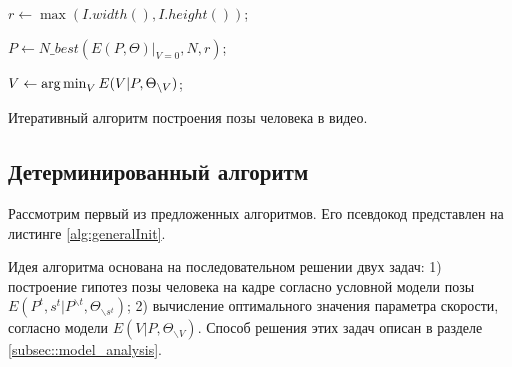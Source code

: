 \begin{algorithm}[t]
	\SetAlgoLined %
	
	
	
	$r \leftarrow \max(I.width(), I.height())$;
	
	$P \leftarrow N\_best(E(P, \Theta)\bigg\rvert_{V=0},N, r)$;
	
	$V \leftarrow \operatorname*{arg\,min}_V{E(V|P, \Theta_{\backslash V})}$;
	
	
	\caption{Итеративный алгоритм построения позы человека в видео.}
	\label{alg:generalInit}
\end{algorithm}

\subsection{Детерминированный алгоритм}

Рассмотрим первый из предложенных алгоритмов. Его псевдокод представлен на листинге \ref{alg:generalInit}. 

Идея алгоритма основана на последовательном решении двух задач: 1) построение гипотез позы человека на кадре согласно условной модели позы $E(P^t, s^t| P^{\backslash t}, \Theta_{\backslash s^t})$; 2) вычисление оптимального значения параметра скорости, согласно модели $E(V|P, \Theta_{\backslash V})$. Способ решения этих задач описан в разделе \ref{subsec::model_analysis}.

